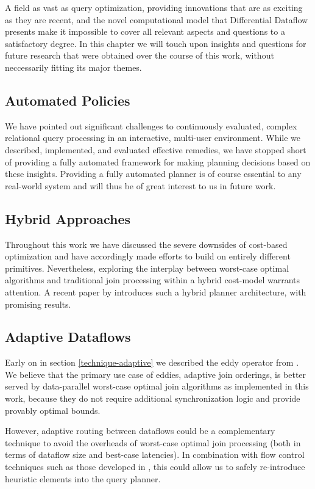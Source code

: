 \documentclass[../index.tex]{subfiles}
\begin{document}
A field as vast as query optimization, providing innovations that are
as exciting as they are recent, and the novel computational model that
Differential Dataflow presents make it impossible to cover all
relevant aspects and questions to a satisfactory degree. In this
chapter we will touch upon insights and questions for future research
that were obtained over the course of this work, without neccessarily
fitting its major themes.

\subsection{Automated Policies}

We have pointed out significant challenges to continuously evaluated,
complex relational query processing in an interactive, multi-user
environment. While we described, implemented, and evaluated effective
remedies, we have stopped short of providing a fully automated
framework for making planning decisions based on these
insights. Providing a fully automated planner is of course essential
to any real-world system and will thus be of great interest to us in
future work.

\subsection{Hybrid Approaches}

Throughout this work we have discussed the severe downsides of
cost-based optimization and have accordingly made efforts to build on
entirely different primitives. Nevertheless, exploring the interplay
between worst-case optimal algorithms and traditional join processing
within a hybrid cost-model warrants attention. A recent paper by
\cite{mhedhbi2019optimizing} introduces such a hybrid planner
architecture, with promising results.

\subsection{Adaptive Dataflows}

Early on in section \ref{technique-adaptive} we described the eddy
operator from \cite{avnur2000eddies}. We believe that the primary use
case of eddies, adaptive join orderings, is better served by
data-parallel worst-case optimal join algorithms as implemented in
this work, because they do not require additional synchronization
logic and provide provably optimal bounds.

However, adaptive routing between dataflows could be a complementary
technique to avoid the overheads of worst-case optimal join processing
(both in terms of dataflow size and best-case latencies). In
combination with flow control techniques such as those developed in
\cite{lattuada2016faucet}, this could allow us to safely re-introduce
heuristic elements into the query planner.
\end{document}
